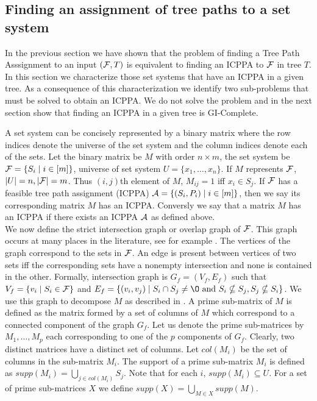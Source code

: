 \subsection{Finding an assignment of tree paths to a set
  system} \label{decompos} In the previous section we have shown that
the problem of finding a Tree Path Asssignment to an input $({\cal F},T)$
is equivalent to finding an ICPPA to ${\cal F}$ in tree $T$.  In this
section we characterize those set systems that have an ICPPA in a
given tree.  As a consequence of this characterization we identify two
sub-problems that must be solved to obtain an ICPPA.  We do not solve
the problem and in the next section show that finding an ICPPA in a
given tree is GI-Complete.

\noindent
A set system can be concisely represented by a binary matrix where the
row indices denote the universe of the set system and the column
indices denote each of the sets. Let the binary matrix be $M$ with
order $n \times m$, the set system be ${\cal F} = \{S_i \mid i \in [m]\}$,
universe of set system $U = \{x_1, \dots ,x_n\}$. If $M$ represents
${\cal F}$, $|U| = n, |{\cal F}| = m$. Thus $(i,j)$th element of $M$, $M_{ij} =
1$ iff $x_i \in S_j$. If ${\cal F}$ has a feasible tree path assignment
(ICPPA) ${\cal A} = \{(S_i,P_i) \mid i \in [m]\}$, then we say its
corresponding matrix $M$ has an ICPPA. Conversly we say that a matrix
$M$ has an ICPPA if there exists an ICPPA ${\cal A}$ as defined
above.\\
\noindent
We now define the strict intersection graph or overlap graph of
${\cal F}$. This graph occurs at many places in the literature, see for
example \cite{kklv10, wlh02, nsnrs09}.  The vertices of the graph
correspond to the sets in ${\cal F}$.  An edge is present between vertices
of two sets iff the corresponding sets have a nonempty intersection
and none is contained in the other. Formally, intersection graph is
$G_f = (V_f, E_f)$ such that $V_f = \{v_i \mid S_i \in {\cal F}\}$ and $E_f
= \{(v_i, v_j) \mid S_i \cap S_j \ne \O \text{ and }S_i \nsubseteq
S_j, S_j \nsubseteq S_i \}$.  We use this graph to decompose $M$ as
described in \cite{wlh02,nsnrs09}.  A prime sub-matrix of $M$ is
defined as the matrix formed by a set of columns of $M$ which
correspond to a connected component of the graph $G_f$.  Let us denote
the prime sub-matrices by $M_1,\ldots,M_p$ each corresponding to one
of the $p$ components of $G_f$. Clearly, two distinct matrices have a
distinct set of columns.  Let $col(M_i)$ be the set of columns in the
sub-matrix $M_i$.  The support of a prime sub-matrix $M_i$ is defined
as $supp(M_i) = \displaystyle \bigcup_{j \in col(M_i)}S_j$.  Note that
for each $i$, $supp(M_i) \subseteq U$.  For a set of prime
sub-matrices $X$ we define
$supp(X) = \displaystyle \bigcup_{M \in X} supp(M)$. \\


